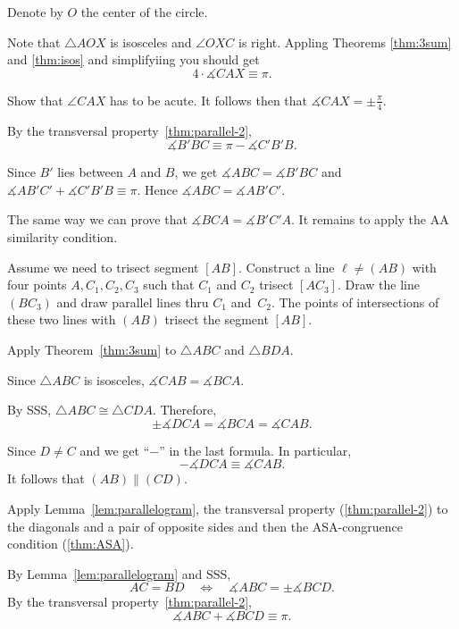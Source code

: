 Denote by $O$ the center of the circle.

Note that $\triangle AOX$ is isosceles
and $\angle OXC$ is right.
Appling Theorems \ref{thm:3sum} and \ref{thm:isos} and simplifyiing you should get
\[
4\cdot \measuredangle CAX
\equiv
\pi.
\]

Show that $\angle CAX$ has to be acute.
It follows then that 
$\measuredangle CAX=\pm\tfrac\pi4$.


By the transversal property~\ref{thm:parallel-2},
\[\measuredangle B'BC \equiv \pi -\measuredangle C'B'B.\]

Since $B'$ lies between $A$ and $B$, we get 
$\measuredangle ABC=\measuredangle B'BC$ and $\measuredangle AB'C'+\measuredangle C'B'B\equiv \pi$.
Hence $\measuredangle ABC= \measuredangle AB'C'$.

The same way we can prove that 
$\measuredangle BCA= \measuredangle B'C'A$.
It remains to apply the AA similarity condition.

Assume we need to trisect segment $[AB]$.
Construct a line $\ell\ne (AB)$ with four points $A,C_1,C_2, C_3$
such that $C_1$ and $C_2$ trisect $[AC_3]$.
Draw the line $(BC_3)$
and draw parallel lines thru $C_1$ and~$C_2$.
The points of intersections of these two lines with $(AB)$ trisect the segment $[AB]$.

Apply Theorem~\ref{thm:3sum} to $\triangle ABC$ and $\triangle BDA$.

Since $\triangle ABC$ is isosceles, $\measuredangle CAB=\measuredangle BCA$.
 
By SSS, $\triangle ABC\cong \triangle CDA$.
Therefore, 
$$\pm\measuredangle DCA= \measuredangle BCA=\measuredangle CAB.$$

Since $D\ne C$ and we get ``$-$'' in the last formula.
In particular,
$$-\measuredangle DCA\equiv \measuredangle CAB.$$
It follows that $(AB)\parallel (CD)$.

Apply Lemma~\ref{lem:parallelogram},
the transversal property (\ref{thm:parallel-2}) to the diagonals and a pair of opposite sides and then the ASA-congruence condition (\ref{thm:ASA}).

By Lemma~\ref{lem:parallelogram} and SSS, 
\[AC=BD
\quad
\iff
\quad
\measuredangle ABC=\pm \measuredangle BCD.\]
By the transversal property~\ref{thm:parallel-2}, 
\[\measuredangle ABC+\measuredangle BCD\equiv \pi.\]

